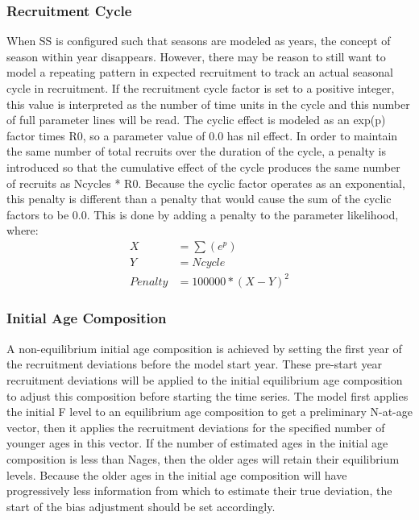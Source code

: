 \subsubsection{Recruitment Cycle}
When SS is configured such that seasons are modeled as years, the concept of season within year disappears.  However, there may be reason to still want to model a repeating pattern in expected recruitment to track an actual seasonal cycle in recruitment.  If the recruitment cycle factor is set to a positive integer, this value is interpreted as the number of time units in the cycle and this number of full parameter lines will be read.  The cyclic effect is modeled as an exp(p) factor times R0, so a parameter value of 0.0 has nil effect.  In order to maintain the same number of total recruits over the duration of the cycle, a penalty is introduced so that the cumulative effect of the cycle produces the same number of recruits as Ncycles * R0.  Because the cyclic factor operates as an exponential, this penalty is different than a penalty that would cause the sum of the cyclic factors to be 0.0.  This is done by adding a penalty to the parameter likelihood, where:
\begin{equation}
	\begin{split}
				   X & = \sum(e^p)  \\
				   Y & = Ncycle  \\
				   Penalty & = 100000*(X-Y)^2
	\end{split}
\end{equation}

\subsubsection{Initial Age Composition}
A non-equilibrium initial age composition is achieved by setting the first year of the recruitment deviations before the model start year.  These pre-start year recruitment deviations will be applied to the initial equilibrium age composition to adjust this composition before starting the time series.  The model first applies the initial F level to an equilibrium age composition to get a preliminary N-at-age vector, then it applies the recruitment deviations for the specified number of younger ages in this vector.  If the number of estimated ages in the initial age composition is less than Nages, then the older ages will retain their equilibrium levels.  Because the older ages in the initial age composition will have progressively less information from which to estimate their true deviation, the start of the bias adjustment should be set accordingly.

